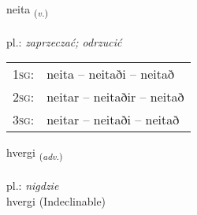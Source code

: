 \documentclass[frontgrid, backgrid]{flacards}\usepackage[]{graphicx}\usepackage[]{xcolor}
\begin{document}
\renewcommand{\flhead}{\vskip5pt \fboxsep=0pt {\small\bfseries\footnotesize Sagnorð | Verb}}
\renewcommand{\fcfoot}{\vskip5pt \fboxsep=0pt \hspace{2pt}{\small\bfseries\footnotesize 2K}}

\renewcommand{\blhead}{\vskip5pt {\small\bfseries\footnotesize Sagnorð | Verb }}
\renewcommand{\bcfoot}{\vskip5pt \hspace{2pt}{\small\bfseries\footnotesize 2K}}


{neita \small{\textsubscript{(\textit{v.})}} \\[1ex] %
\textphonetic{[neiːta]} \\
pl.: \emph{zaprzeczać; odrzucić} \\  [2ex]
\renewcommand*{\arraystretch}{0.8}
\begin{tabular}{p{1cm}l}
\textsc{1sg}: & neita -- neitaði -- neitað \\ 
\textsc{2sg}: & neitar -- neitaðir -- neitað \\ 
\textsc{3sg}: & neitar -- neitaði -- neitað \\ 
\end{tabular}
}


\renewcommand{\flhead}{\vskip5pt \fboxsep=0pt {\small\bfseries\footnotesize Atviksorð | Adverb}}
\renewcommand{\fcfoot}{\vskip5pt \fboxsep=0pt \hspace{2pt}{\small\bfseries\footnotesize 2K}}

\renewcommand{\blhead}{\vskip5pt {\small\bfseries\footnotesize Atviksorð | Adverb }}
\renewcommand{\bcfoot}{\vskip5pt \hspace{2pt}{\small\bfseries\footnotesize 2K}}


{hvergi \small{\textsubscript{(\textit{adv.})}} \\[1ex]
\textphonetic{[kʰvɛrcɪ]} \\
pl.: \emph{nigdzie} \\  [2ex]
hvergi (Indeclinable)}
\end{document}
